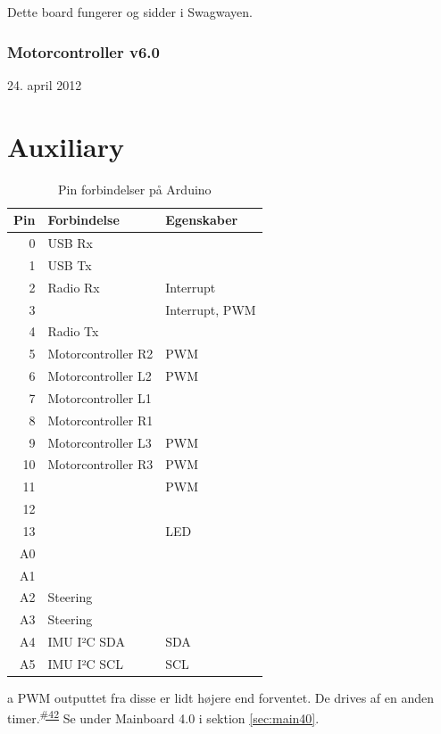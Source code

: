 \documentclass[a4paper,twoside,article,danish,table]{memoir}
\newcommand{\boarddate}[1]{\textcolor{blue!80!black}{#1}}
\newcommand{\issue}[1]{\textsuperscript{\textcolor{blue!80!black}{\href{https://github.com/neic/Swagway/issues/#1}{\##1}}}}
\begin{document}
Dette board fungerer og sidder i Swagwayen.

\subsection{Motorcontroller v6.0}
\boarddate{24. april 2012}

\chapter{Auxiliary}
\begin{table}[htbp]
  \caption{Pin forbindelser på Arduino}
  \centering
  \begin{threeparttable}
    \begin{tabular}{rll}
      \toprule
      Pin & Forbindelse & Egenskaber\\
      \midrule
      0 & USB Rx & \\
      1 & USB Tx & \\
      2 & Radio Rx & Interrupt\\
      3 & & Interrupt, PWM\\
      4 & Radio Tx & \\
      5 & Motorcontroller R2 & PWM\tnote{a}\\
      6 & Motorcontroller L2 & PWM\tnote{a}\\
      7 & Motorcontroller L1 & \\
      8 & Motorcontroller R1 & \\
      9 & Motorcontroller L3 & PWM\\
      10 & Motorcontroller R3 & PWM\\
      11 & & PWM\\
      12 & & \\
      13 & & LED\\
      A0 & & \\
      A1 & & \\
      A2 & Steering & \\
      A3 & Steering & \\
      A4 & IMU I²C SDA & SDA\\
      A5 & IMU I²C SCL & SCL
    \end{tabular}
    \begin{tablenotes}
      \item[a]{PWM outputtet fra disse er lidt højere end forventet. De drives af en anden timer.\issue{42} Se under Mainboard 4.0 i sektion \ref{sec:main40}.}
    \end{tablenotes}
  \end{threeparttable}
\end{table}
\end{document}

